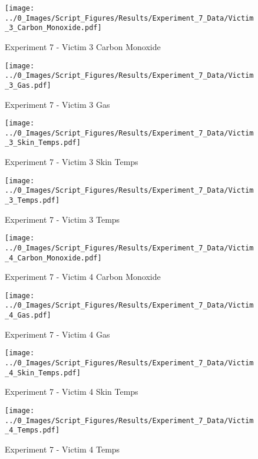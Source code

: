 	\clearpage

	\begin{figure}[H]
		\centering
		\texttt{[image: ../0\_Images/Script\_Figures/Results/Experiment\_7\_Data/Victim\_3\_Carbon\_Monoxide.pdf]}
		\caption[]{Experiment 7 - Victim 3 Carbon Monoxide}
	\end{figure}
 

	\begin{figure}[H]
		\centering
		\texttt{[image: ../0\_Images/Script\_Figures/Results/Experiment\_7\_Data/Victim\_3\_Gas.pdf]}
		\caption[]{Experiment 7 - Victim 3 Gas}
	\end{figure}
 
	\clearpage

	\begin{figure}[H]
		\centering
		\texttt{[image: ../0\_Images/Script\_Figures/Results/Experiment\_7\_Data/Victim\_3\_Skin\_Temps.pdf]}
		\caption[]{Experiment 7 - Victim 3 Skin Temps}
	\end{figure}
 

	\begin{figure}[H]
		\centering
		\texttt{[image: ../0\_Images/Script\_Figures/Results/Experiment\_7\_Data/Victim\_3\_Temps.pdf]}
		\caption[]{Experiment 7 - Victim 3 Temps}
	\end{figure}
 
	\clearpage

	\begin{figure}[H]
		\centering
		\texttt{[image: ../0\_Images/Script\_Figures/Results/Experiment\_7\_Data/Victim\_4\_Carbon\_Monoxide.pdf]}
		\caption[]{Experiment 7 - Victim 4 Carbon Monoxide}
	\end{figure}
 

	\begin{figure}[H]
		\centering
		\texttt{[image: ../0\_Images/Script\_Figures/Results/Experiment\_7\_Data/Victim\_4\_Gas.pdf]}
		\caption[]{Experiment 7 - Victim 4 Gas}
	\end{figure}
 
	\clearpage

	\begin{figure}[H]
		\centering
		\texttt{[image: ../0\_Images/Script\_Figures/Results/Experiment\_7\_Data/Victim\_4\_Skin\_Temps.pdf]}
		\caption[]{Experiment 7 - Victim 4 Skin Temps}
	\end{figure}
 

	\begin{figure}[H]
		\centering
		\texttt{[image: ../0\_Images/Script\_Figures/Results/Experiment\_7\_Data/Victim\_4\_Temps.pdf]}
		\caption[]{Experiment 7 - Victim 4 Temps}
	\end{figure}
 
